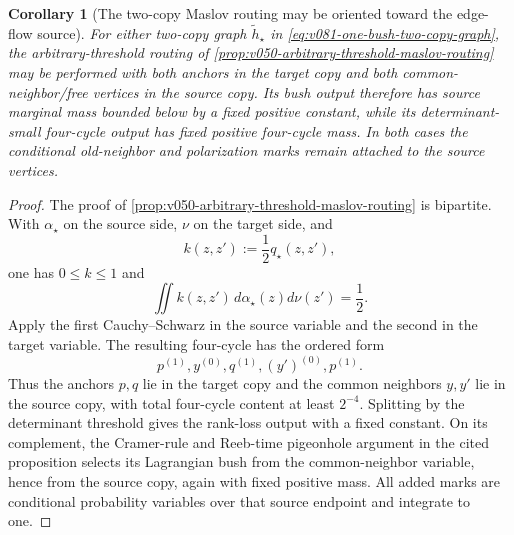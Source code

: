\documentclass[10pt]{article}
\newtheorem{corollary}[theorem]{Corollary}
\begin{document}
\begin{corollary}[The two-copy Maslov routing may be oriented toward the edge-flow source]
\label{cor:v081-oriented-two-copy-maslov-routing}
For either two-copy graph
\(\widetilde h_\star\) in
\eqref{eq:v081-one-bush-two-copy-graph}, the arbitrary-threshold routing of
\cref{prop:v050-arbitrary-threshold-maslov-routing} may be performed with both anchors in the
target copy and both common-neighbor/free vertices in the source copy.  Its bush output therefore
has source marginal mass bounded below by a fixed positive constant, while its determinant-small
four-cycle output has fixed positive four-cycle mass.  In both cases the conditional old-neighbor
and polarization marks remain attached to the source vertices.
\end{corollary}

\begin{proof}
The proof of \cref{prop:v050-arbitrary-threshold-maslov-routing} is bipartite.  With
\(\alpha_\star\) on the source side, \(\nu\) on the target side, and
\[
k(z,z'):=\frac12q_\star(z,z'),
\]
one has \(0\le k\le1\) and
\[
\iint k(z,z')\,d\alpha_\star(z)d\nu(z')=\frac12.
\]
Apply the first Cauchy--Schwarz in the source variable and the second in the target variable.
The resulting four-cycle has the ordered form
\[
p^{(1)},y^{(0)},q^{(1)},(y')^{(0)},p^{(1)}.
\]
Thus the anchors \(p,q\) lie in the target copy and the common neighbors \(y,y'\) lie in the
source copy, with total four-cycle content at least \(2^{-4}\).  Splitting by the determinant
threshold gives the rank-loss output with a fixed constant.  On its complement, the Cramer-rule
and Reeb-time pigeonhole argument in the cited proposition selects its Lagrangian bush from the
common-neighbor variable, hence from the source copy, again with fixed positive mass.  All added
marks are conditional probability variables over that source endpoint and integrate to one.
\end{proof}
\end{document}
